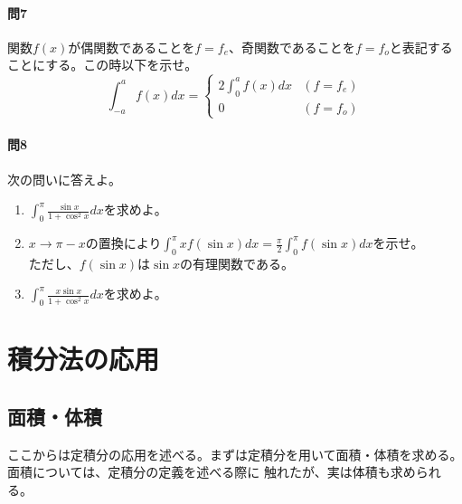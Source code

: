 \documentclass[a4j,dvipdfmx]{jsarticle}
\begin{document}
                \paragraph{問7}関数$f(x)$が偶関数であることを$f=f_e$、奇関数であることを$f=f_o$と表記することにする。この時以下を示せ。
                \begin{equation}
                    \int_{-a}^a f(x)dx = \begin{cases}
                        \displaystyle 2\int_{0}^{a}f(x)dx & (f=f_e) \\ 0 & (f=f_o)
                    \end{cases}\label{eq:定積分と偶関数・奇関数}
                \end{equation}

                \paragraph{問8}次の問いに答えよ。
                \begin{enumerate}\setcounter{enumi}{0}\renewcommand{\labelenumi}{(\arabic{enumi})}
                    \item $\displaystyle \int_0^\pi \frac{\sin x}{1+\cos^2 x}dx$を求めよ。
                    \item $x\to\pi -x$の置換により$\displaystyle \int_{0}^{\pi}xf(\sin x)dx=\frac{\pi}{2}\int_{0}^{\pi}f(\sin x)dx$を示せ。\\ただし、$f(\sin x)$は$\sin x$の有理関数である。
                    \item $\displaystyle \int_{0}^{\pi} \frac{x\sin x}{1+\cos^2 x}dx$を求めよ。
                \end{enumerate}
            \clearpage
        \section{積分法の応用}
            \subsection{面積・体積} 
                ここからは定積分の応用を述べる。まずは定積分を用いて面積・体積を求める。面積については、定積分の定義を述べる際に
                触れたが、実は体積も求められる。
\end{document}
